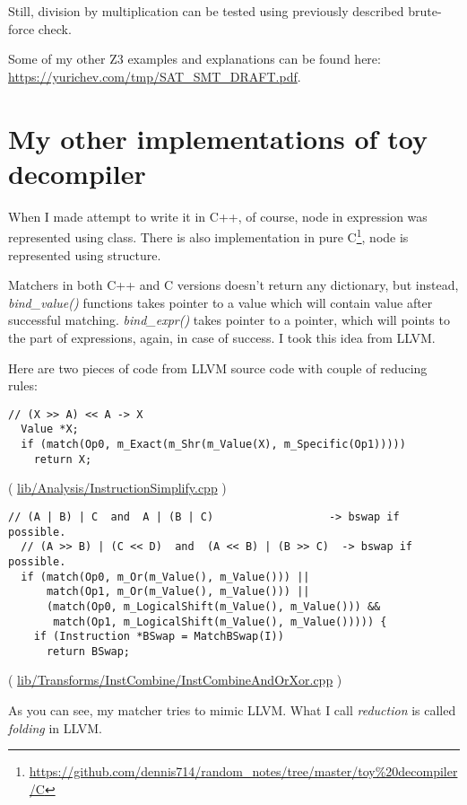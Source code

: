 ﻿\documentclass[12pt]{article}
\begin{document}
Still, division by multiplication can be tested using previously described brute-force check.

Some of my other Z3 examples and explanations can be found here: \url{https://yurichev.com/tmp/SAT_SMT_DRAFT.pdf}.

\section{My other implementations of toy decompiler}

When I made attempt to write it in C++, of course, node in expression was represented using class.
There is also implementation in pure C\footnote{\url{https://github.com/dennis714/random_notes/tree/master/toy\%20decompiler/C}}, node is represented using structure.

Matchers in both C++ and C versions doesn't return any dictionary, but instead, \textit{bind\_value()}
functions takes pointer to a value which will contain value after successful matching.
\textit{bind\_expr()} takes pointer to a pointer, which will points to the part of expressions, again, in case of success.
I took this idea from LLVM.

Here are two pieces of code from LLVM source code with couple of reducing rules:

\begin{lstlisting}
// (X >> A) << A -> X
  Value *X;
  if (match(Op0, m_Exact(m_Shr(m_Value(X), m_Specific(Op1)))))
    return X;
\end{lstlisting}

( \href{http://llvm.org/docs/doxygen/html/InstructionSimplify_8cpp_source.html}{lib/Analysis/InstructionSimplify.cpp} )

\begin{lstlisting}
// (A | B) | C  and  A | (B | C)                  -> bswap if possible.
  // (A >> B) | (C << D)  and  (A << B) | (B >> C)  -> bswap if possible.
  if (match(Op0, m_Or(m_Value(), m_Value())) ||
      match(Op1, m_Or(m_Value(), m_Value())) ||
      (match(Op0, m_LogicalShift(m_Value(), m_Value())) &&
       match(Op1, m_LogicalShift(m_Value(), m_Value())))) {
    if (Instruction *BSwap = MatchBSwap(I))
      return BSwap;
\end{lstlisting}
( \href{https://github.com/numba/llvm-mirror/blob/master/lib/Transforms/InstCombine/InstCombineAndOrXor.cpp}{lib/Transforms/InstCombine/InstCombineAndOrXor.cpp} )

As you can see, my matcher tries to mimic LLVM.
What I call \textit{reduction} is called \textit{folding} in LLVM.
\end{document}
